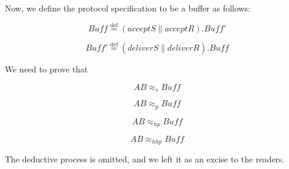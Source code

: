 Now, we define the protocol specification to be a buffer as follows:

$$Buff\overset{\text{def}}{=}(acceptS\parallel acceptR).Buff'$$

$$Buff'\overset{\text{def}}{=}(\overline{deliverS}\parallel \overline{deliverR}).Buff$$

We need to prove that

$$AB\approx_s Buff$$

$$AB\approx_p Buff$$

$$AB\approx_{hp} Buff$$

$$AB\approx_{hhp} Buff$$

The deductive process is omitted, and we left it as an excise to the readers. 